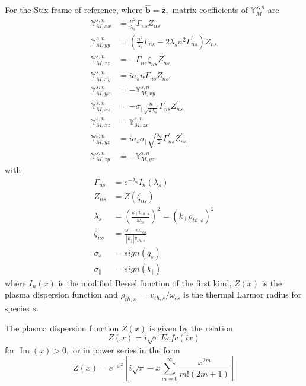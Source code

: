 \documentclass[a4paper,12pt]{article}%
\begin{document}
For the Stix frame of reference, where $\widehat{\mathbf{b}}\mathbf{=}%
\widehat{\mathbf{z}}\mathbf{,}$ matrix coefficients of $\mathbb{Y}_{M}^{s,n}$
are%
\begin{align}
\mathbb{Y}_{M,xx}^{s,n}  &  =\frac{n^{2}}{\lambda_{s}}\Gamma_{ns}%
Z_{ns}\label{a}\\
\mathbb{Y}_{M,yy}^{s,n}  &  =\left(  \frac{n^{2}}{\lambda_{s}}\Gamma
_{ns}-2\lambda_{s}n^{2}\Gamma_{ns}^{\prime}\right)  Z_{ns}\label{b}\\
\mathbb{Y}_{M,zz}^{s,n}  &  =-\Gamma_{ns}\zeta_{ns}Z_{ns}^{\prime}\label{c}\\
\mathbb{Y}_{M,xy}^{s,n}  &  =i\sigma_{s}n\Gamma_{ns}^{\prime}Z_{ns}\label{d}\\
\mathbb{Y}_{M,yx}^{s,n}  &  =-\mathbb{Y}_{M,xy}^{s,n}\label{e}\\
\mathbb{Y}_{M,xz}^{s,n}  &  =-\sigma_{\Vert}\frac{n}{\sqrt{2\lambda_{s}}%
}\Gamma_{ns}Z_{ns}^{\prime}\label{f}\\
\mathbb{Y}_{M,xz}^{s,n}  &  =\mathbb{Y}_{M,zx}^{s,n}\label{g}\\
\mathbb{Y}_{M,yz}^{s,n}  &  =i\sigma_{s}\sigma_{\Vert}\sqrt{\frac{\lambda_{s}%
}{2}}\Gamma_{ns}^{\prime}Z_{ns}^{\prime}\label{h}\\
\mathbb{Y}_{M,zy}^{s,n}  &  =-\mathbb{Y}_{M,yz}^{s,n} \label{i}%
\end{align}
with%
\begin{align*}
\Gamma_{ns}  &  =e^{-\lambda_{s}}I_{n}\left(  \lambda_{s}\right) \\
Z_{ns}  &  =Z\left(  \zeta_{ns}\right) \\
\lambda_{s}  &  =\left(  \frac{k_{\bot}v_{th,s}}{\omega_{cs}}\right)
^{2}=\left(  k_{\bot}\rho_{th,s}\right)  ^{2}\\
\zeta_{ns}  &  =\frac{\omega-n\omega_{cs}}{\left\vert k_{\Vert}\right\vert
v_{th,s}}\\
\sigma_{s}  &  =sign\left(  q_{s}\right) \\
\sigma_{\Vert}  &  =sign\left(  k_{\Vert}\right)
\end{align*}
where $I_{n}\left(  x\right)  $ is the modified Bessel function of the first
kind, $Z\left(  x\right)  $ is the plasma dispersion function and $\rho
_{th,s}=$ $v_{th,s}/\omega_{cs}$ is the thermal Larmor radius for species $s $.

The plasma dispersion function $Z\left(  x\right)  $ is given by the relation%
\begin{equation}
Z\left(  x\right)  =i\sqrt{\pi}Erfc\left(  ix\right)
\end{equation}
for $\operatorname{Im}\left(  x\right)  >0,$ or in power series in the form%
\begin{equation}
Z\left(  x\right)  =e^{-x^{2}}\left[  i\sqrt{\pi}-x\sum_{m=0}^{\infty}%
\frac{x^{2m}}{m!\left(  2m+1\right)  }\right]
\end{equation}
\end{document}
